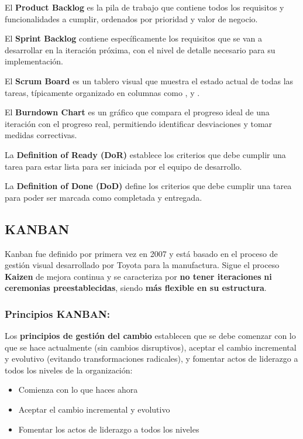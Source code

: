 \documentclass[a4paper,11pt]{report}
\begin{document}
    El \textbf{Product Backlog} es la pila de trabajo que contiene todos los requisitos y funcionalidades a cumplir, ordenados por prioridad y valor de negocio.

    El \textbf{Sprint Backlog} contiene específicamente los requisitos que se van a desarrollar en la iteración próxima, con el nivel de detalle necesario para su implementación.

    El \textbf{Scrum Board} es un tablero visual que muestra el estado actual de todas las tareas, típicamente organizado en columnas como ,  y .

    El \textbf{Burndown Chart} es un gráfico que compara el progreso ideal de una iteración con el progreso real, permitiendo identificar desviaciones y tomar medidas correctivas.

    La \textbf{Definition of Ready (DoR)} establece los criterios que debe cumplir una tarea para estar lista para ser iniciada por el equipo de desarrollo.

    La \textbf{Definition of Done (DoD)} define los criterios que debe cumplir una tarea para poder ser marcada como completada y entregada.



    \subsection{KANBAN}\label{subsec:kanban}

    Kanban fue definido por primera vez en 2007 y está basado en el proceso de gestión visual desarrollado por Toyota para la manufactura.
    Sigue el proceso \textbf{Kaizen} de mejora continua y se caracteriza por \textbf{no tener iteraciones} \textbf{ni ceremonias preestablecidas}, siendo \textbf{más flexible en su estructura}.

    \subsubsection{Principios KANBAN:}

    Los \textbf{principios de gestión del cambio} establecen que se debe comenzar con lo que se hace actualmente (sin cambios disruptivos), aceptar el cambio incremental y evolutivo (evitando transformaciones radicales), y fomentar actos de liderazgo a todos los niveles de la organización:
    \begin{itemize}
        \item Comienza con lo que haces ahora
        \item Aceptar el cambio incremental y evolutivo
        \item Fomentar los actos de liderazgo a todos los niveles
    \end{itemize}
\end{document}
